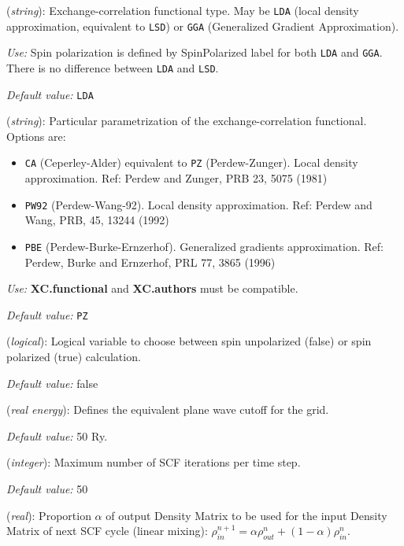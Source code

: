 \begin{description}
\itemsep 10pt
\parsep 0pt

\item[{\bf XC.functional}] ({\it string}): Exchange-correlation functional type.
May be {\tt LDA} (local density approximation, equivalent to {\tt LSD}) or 
{\tt GGA} (Generalized Gradient Approximation). 

{\it Use:} Spin polarization is defined by SpinPolarized label for both
{\tt LDA} and {\tt GGA}. There is no difference between {\tt LDA} and {\tt LSD}.

{\it Default value:} {\tt LDA}
        

\item[{\bf XC.authors}] ({\it string}): Particular parametrization of the
exchange-correlation functional. Options are:
\begin{itemize}
\item {\tt CA} (Ceperley-Alder) equivalent to {\tt PZ} (Perdew-Zunger).
Local density approximation.
Ref: Perdew and Zunger, PRB 23, 5075 (1981)
\item {\tt PW92} (Perdew-Wang-92). 
Local density approximation.
Ref: Perdew and Wang, PRB, 45, 13244 (1992)
\item {\tt PBE} (Perdew-Burke-Ernzerhof). Generalized gradients approximation.
Ref: Perdew, Burke and Ernzerhof, PRL 77, 3865 (1996)
\end{itemize}

{\it Use:} {\bf XC.functional} and {\bf XC.authors} must be compatible.

{\it Default value:} {\tt PZ}


\item[{\bf SpinPolarized}] ({\it logical}): Logical variable to 
choose between spin unpolarized (false) 
or spin polarized (true) calculation.

{\it Default value:} false

        
\item[{\bf MeshCutoff}] ({\it real energy}): 
Defines the equivalent plane wave cutoff for the grid.

{\it Default value:} 50 Ry.

\item[{\bf MaxSCFIterations}] ({\it integer}): Maximum number of 
SCF iterations per time step.

{\it Default value:} 50

\item[{\bf DM.MixingWeight}] ({\it real}): Proportion $\alpha$ of 
output Density Matrix to be used for the input Density Matrix of 
next SCF cycle (linear mixing):
$\rho^{n+1}_{in} = \alpha \rho^{n}_{out} 
+(1 - \alpha) \rho^{n}_{in}$.


\end{description}
